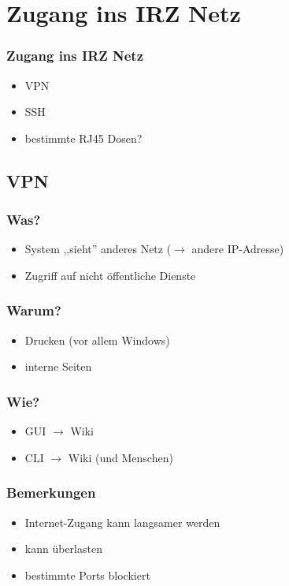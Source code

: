 \documentclass{beamer}
\begin{document}
    \section{Zugang ins IRZ Netz}
    \begin{frame}
        \frametitle{Zugang ins IRZ Netz}
        \begin{itemize}
            \item VPN
            \item SSH
            \item bestimmte RJ45 Dosen?
        \end{itemize}
    \end{frame}

    \subsection{VPN}
    \begin{frame}
        \frametitle{Was?}
        \begin{itemize}
            \item System ,,sieht'' anderes Netz ($\rightarrow$ andere IP-Adresse)
            \item Zugriff auf nicht öffentliche Dienste
        \end{itemize}
    \end{frame}
    \begin{frame}
        \frametitle{Warum?}
        \begin{itemize}
            \item Drucken (vor allem Windows)
            \item interne Seiten
        \end{itemize}
    \end{frame}
    \begin{frame}
        \frametitle{Wie?}
        \begin{itemize}
            \item GUI $\longrightarrow$ Wiki
            \item CLI $\longrightarrow$ Wiki (und Menschen)
        \end{itemize}
    \end{frame}
    \begin{frame}
        \frametitle{Bemerkungen}
        \begin{itemize}
            \item Internet-Zugang kann langsamer werden
            \item kann überlasten
            \item bestimmte Ports blockiert
        \end{itemize}
    \end{frame}
\end{document}
